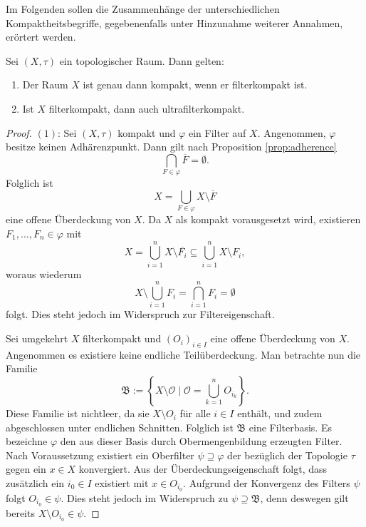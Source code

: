 Im Folgenden sollen die Zusammenhänge der unterschiedlichen Kompaktheitsbegriffe, gegebenenfalls unter Hinzunahme weiterer Annahmen, erörtert werden.

\begin{thm}
\label{thm:compactness}
  Sei $(X,\tau)$ ein topologischer Raum. Dann gelten:
  \begin{enumerate}[(1)]
    \item Der Raum $X$ ist genau dann kompakt, wenn er filterkompakt ist. 
    \item Ist $X$ filterkompakt, dann auch ultrafilterkompakt.
  \end{enumerate}
\end{thm}

\begin{proof}
  $(1)$: 
  Sei $(X,\tau)$ kompakt und $\varphi$ ein Filter auf $X$.
  Angenommen, $\varphi$ besitze keinen Adhärenzpunkt.
  Dann gilt nach Proposition \ref{prop:adherence}
  \begin{displaymath}
    \bigcap_{F \in \varphi} \overline{F} = \emptyset.
  \end{displaymath}
  Folglich ist 
  \begin{displaymath}
    X = \bigcup_{F \in \varphi} X \setminus \overline{F} 
  \end{displaymath}
  eine offene Überdeckung von $X$.
  Da $X$ als kompakt vorausgesetzt wird, existieren $F_1,\dots,F_n \in \varphi$ mit
  \begin{displaymath}
    X = \bigcup_{i = 1}^n X \setminus \overline{F_i} \subseteq \bigcup_{i = 1}^n X \setminus F_i,
  \end{displaymath}
  woraus wiederum
  \begin{displaymath}
    X \setminus \bigcup_{i = 1}^n F_i = \bigcap_{i = 1}^n F_i = \emptyset
  \end{displaymath}
  folgt. 
  Dies steht jedoch im Widerspruch zur Filtereigenschaft.

  Sei umgekehrt $X$ filterkompakt und $(O_i)_{i \in I}$ eine offene Überdeckung von $X$.
  Angenommen es existiere keine endliche Teilüberdeckung.
  Man betrachte nun die Familie
  \begin{displaymath}
    \mathfrak{B} := \left\{ X \setminus \mathcal{O} \mid \mathcal{O} = \bigcup_{k = 1}^n O_{i_k}\right\}.
  \end{displaymath}
  Diese Familie ist nichtleer, da sie $X \setminus O_i$ für alle $i \in I$ enthält, und zudem abgeschlossen unter endlichen Schnitten.
  Folglich ist $\mathfrak{B}$ eine Filterbasis.
  Es bezeichne $\varphi$ den aus dieser Basis durch Obermengenbildung erzeugten Filter.
  Nach Voraussetzung existiert ein Oberfilter $\psi \supseteq \varphi$ der bezüglich der Topologie $\tau$ gegen ein $x \in X$ konvergiert.
  Aus der Überdeckungseigenschaft folgt, dass zusätzlich ein $i_0 \in I$ existiert mit $x \in O_{i_0}$.
  Aufgrund der Konvergenz des Filters $\psi$ folgt $O_{i_0} \in \psi$.
  Dies steht jedoch im Widerspruch zu $\psi \supseteq \mathfrak{B}$, denn deswegen gilt bereits $X \setminus O_{i_0} \in \psi$.


\end{proof}

